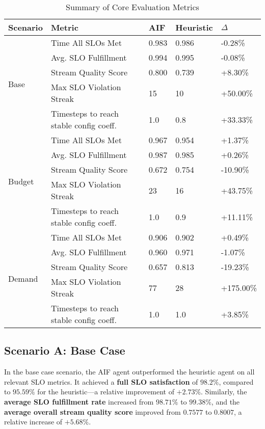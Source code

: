 \begin{table}[h!]
\centering
\caption{Summary of Core Evaluation Metrics}
\label{tab:results_summary}
\begin{tabular}{@{}lllll@{}}
\toprule
\textbf{Scenario} & \textbf{Metric} & \textbf{AIF} & \textbf{Heuristic} & \textbf{$\Delta$} \\
\midrule
\multirow{5}{*}{Base} & Time All SLOs Met & 0.983 & 0.986 & -0.28\% \\
& Avg. SLO Fulfillment & 0.994 & 0.995 & -0.08\% \\
& Stream Quality Score & 0.800 & 0.739 & +8.30\% \\
& Max SLO Violation Streak & 15 & 10 & +50.00\% \\
& Timesteps to reach stable config coeff. & 1.0 & 0.8 & +33.33\% \\
\midrule
\multirow{5}{*}{Budget} & Time All SLOs Met & 0.967 & 0.954 & +1.37\% \\
& Avg. SLO Fulfillment & 0.987 & 0.985 & +0.26\% \\
& Stream Quality Score & 0.672 & 0.754 & -10.90\% \\
& Max SLO Violation Streak & 23 & 16 & +43.75\% \\
& Timesteps to reach stable config coeff. & 1.0 & 0.9 & +11.11\% \\
\midrule
\multirow{5}{*}{Demand} & Time All SLOs Met & 0.906 & 0.902 & +0.49\% \\
& Avg. SLO Fulfillment & 0.960 & 0.971 & -1.07\% \\
& Stream Quality Score & 0.657 & 0.813 & -19.23\% \\
& Max SLO Violation Streak & 77 & 28 & +175.00\% \\
& Timesteps to reach stable config coeff. & 1.0 & 1.0 & +3.85\% \\
\bottomrule
\end{tabular}
\end{table}


\subsection{Scenario A: Base Case}

In the base case scenario, the AIF agent outperformed the heuristic agent on all relevant SLO metrics. It achieved a \textbf{full SLO satisfaction} of \(98.2\%\), compared to \(95.59\%\) for the heuristic---a relative improvement of \(+2.73\%\). Similarly, the \textbf{average SLO fulfillment rate} increased from \(98.71\%\) to \(99.38\%\), and the \textbf{average overall stream quality score} improved from \(0.7577\) to \(0.8007\), a relative increase of \(+5.68\%\).

